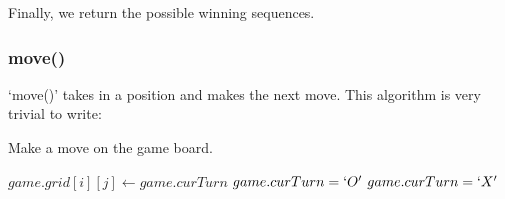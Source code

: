 \documentclass{article}
\begin{document}
Finally, we return the possible winning sequences.

\subsubsection{move()}

`move()' takes in a position and makes the next move. This algorithm is very trivial to write:

\begin{algorithm}
\caption{Make a move on the game board.}

\begin{algorithmic}[1]
\State $game.grid[i][j] \gets game.curTurn$
  \State $game.curTurn = `O'$
  \State $game.curTurn = `X'$
\EndIf
\EndProcedure
\end{algorithmic}
\end{algorithm}
\end{document}
